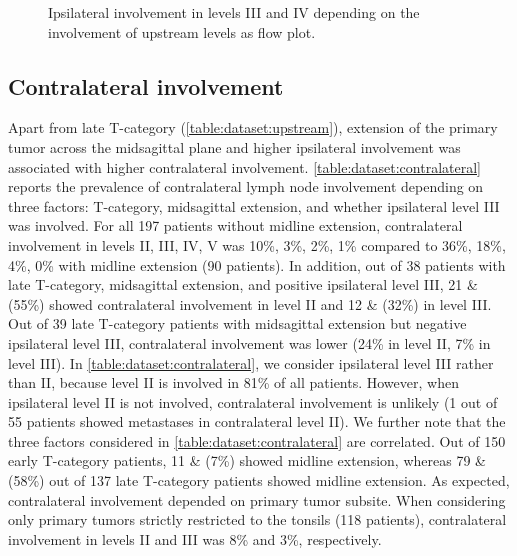 \documentclass[\relativeRoot/main.tex]{subfiles}
\begin{document}
\begin{figure}
    \def\svgwidth{1.0\textwidth}
    
    \caption{
        Ipsilateral involvement in levels III and IV depending on the involvement of upstream levels as flow plot.
    }
    \label{fig:dataset:flowchart}
\end{figure}

\subsection*{Contralateral involvement}

Apart from late T-category (\cref{table:dataset:upstream}), extension of the primary tumor across the midsagittal plane and higher ipsilateral involvement was associated with higher contralateral involvement. \cref{table:dataset:contralateral} reports the prevalence of contralateral lymph node involvement depending on three factors: T-category, midsagittal extension, and whether ipsilateral level III was involved. For all 197 patients without midline extension, contralateral involvement in levels II, III, IV, V was 10\%, 3\%, 2\%, 1\% compared to 36\%, 18\%, 4\%, 0\% with midline extension (90 patients). In addition, out of 38 patients with late T-category, midsagittal extension, and positive ipsilateral level III, 21 \& (55\%) showed contralateral involvement in level II and 12 \& (32\%) in level III. Out of 39 late T-category patients with midsagittal extension but negative ipsilateral level III, contralateral involvement was lower (24\% in level II, 7\% in level III). In \cref{table:dataset:contralateral}, we consider ipsilateral level III rather than II, because level II is involved in 81\% of all patients. However, when ipsilateral level II is not involved, contralateral involvement is unlikely (1 out of 55 patients showed metastases in contralateral level II). We further note that the three factors considered in \cref{table:dataset:contralateral} are correlated. Out of 150 early T-category patients, 11 \& (7\%) showed midline extension, whereas 79 \& (58\%) out of 137 late T-category patients showed midline extension. As expected, contralateral involvement depended on primary tumor subsite. When considering only primary tumors strictly restricted to the tonsils (118 patients), contralateral involvement in levels II and III was 8\% and 3\%, respectively.
\end{document}
